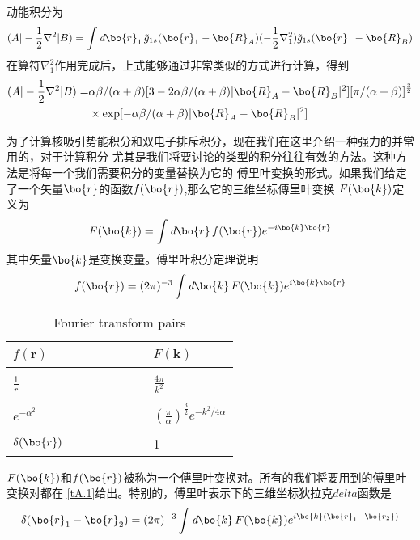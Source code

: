 动能积分为
\begin{align}
	\label{A.10}
	(A|-\frac{1}{2}\nabla^2|B)=\int \emph{d}\bo{r}_1\,\tilde{g}_{1s}(\bo{r}_1-\bo{R}_A)(-\frac{1}{2}\nabla_1^2)\tilde{g}_{1s}(\bo{r}_1-\bo{R}_B)
\end{align}
在算符$\nabla_1^2$作用完成后，上式能够通过非常类似的方式进行计算，得到
\begin{align}
	\label{A.11}
	(A|-\frac{1}{2}\nabla^2|B)=&\alpha\beta/(\alpha+\beta)[3-2\alpha\beta/(\alpha+\beta)\lvert \bo{R}_A-\bo{R}_B \rvert ^2][\pi/(\alpha+\beta)]^{\frac{3}{2}}\nonumber\\
	&\times\exp[-\alpha\beta/(\alpha+\beta)\lvert \bo{R}_A-\bo{R}_B \rvert ^2]
\end{align}

为了计算核吸引势能积分和双电子排斥积分，现在我们在这里介绍一种强力的并常用的，对于计算积分
尤其是我们将要讨论的类型的积分往往有效的方法。这种方法是将每一个我们需要积分的变量替换为它的
傅里叶变换的形式。如果我们给定了一个矢量$\bo{r}$的函数$f(\bo{r})$,那么它的三维坐标傅里叶变换
$F(\bo{k})$定义为
\begin{align}
	\label{A.12}
	F(\bo{k})=\int \emph{d}\bo{r}\,f(\bo{r})e^{-i\bo{k}\bo{r}}
\end{align}
其中矢量$\bo{k}$是变换变量。傅里叶积分定理说明
\begin{align}
	\label{A.13}
	f(\bo{r})=(2\pi)^{-3}\int \emph{d}\bo{k}\,F(\bo{k})e^{i\bo{k}\bo{r}}
\end{align}
\begin{table}[h!] 
	
	\caption{Fourier transform pairs}
	\centering
	\begin{tabular}{lll}
		\hline 
		$f(\bm{r})$ & ~~~~ ~~~~& $F(\bm{k})$ \\ \hline \\
		$\frac{1}{r}$&  ~~~~ ~~~~& $\frac{4\pi}{k^2}$ \\
		\\
		$e^{-\alpha^2}$ & ~~~~ ~~~~ & $(\frac{\pi}{\alpha})^{\frac{3}{2}}e^{-k^2/{4\alpha}}$\\
		\\
		$\delta(\bo{r})$& ~~~~ ~~~~ &1
	\\ \hline
	\end{tabular}
	\label{tA.1}
\end{table}
$F(\bo{k})$和$f(\bo{r})$被称为一个傅里叶变换对。所有的我们将要用到的傅里叶变换对都在
\autoref{tA.1}给出。特别的，傅里叶表示下的三维坐标狄拉克$delta$函数是
\begin{align}
	\label{A.14}
	\delta(\bo{r}_1-\bo{r}_2)=(2\pi)^{-3}\int \emph{d}\bo{k}\,F(\bo{k})e^{i\bo{k}(\bo{r}_1-\bo{r_2})}
\end{align}

